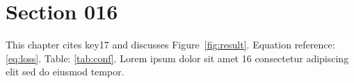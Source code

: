 \section{Section 016}\label{sec:s16}
This chapter cites key17 and discusses Figure~\ref{fig:result}.
Equation reference: \eqref{eq:loss}. Table: \ref{tab:conf}.
Lorem ipsum dolor sit amet 16 consectetur adipiscing elit sed do eiusmod tempor.
